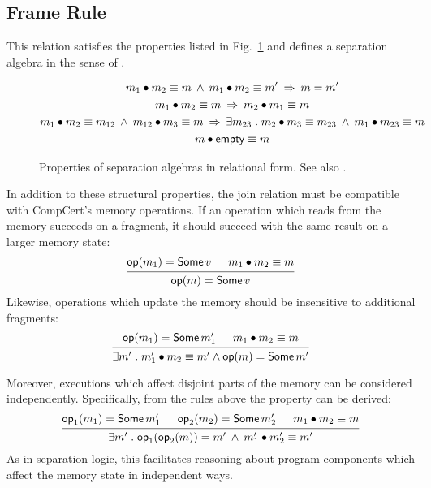 \subsection{Frame Rule}

This relation satisfies the properties listed in Fig.~\ref{fig:sepalg}
and defines a separation algebra in the sense of \citet{freshlook}.

\begin{figure}
  \begin{gather*}
    m_1 \bullet m_2 \equiv m \:\wedge\:
    m_1 \bullet m_2 \equiv m' \:\Rightarrow\:
    m = m'
    \\
    m_1 \bullet m_2 \equiv m \:\Rightarrow\:
    m_2 \bullet m_1 \equiv m
    \\
    m_1 \bullet m_2 \equiv m_{12} \:\wedge\:
    m_{12} \bullet m_3 \equiv m \:\Rightarrow\:
    \exists m_{23} \mathrel.
    m_2 \bullet m_3 \equiv m_{23} \:\wedge\:
    m_1 \bullet m_{23} \equiv m
    \\
    m \bullet  \mathsf{empty}  \equiv m
  \end{gather*}
  \caption{Properties of separation algebras
  in relational form. See also \citet{freshlook}.}
  \label{fig:sepalg}
\end{figure}

In addition to these structural properties,
the join relation must be compatible
with CompCert's memory operations.
If an operation which reads from the memory succeeds on a fragment,
it should succeed with the same result on a larger memory state:
\[
  \begin{prooftree}
    \hypo{\kw{op}(m_1) = \kw{Some}\,v}
    \hypo{m_1 \bullet m_2 \equiv m}
    \infer2{\kw{op}(m) = \kw{Some}\,v}
  \end{prooftree}
\]
Likewise,
operations which update the memory
should be insensitive to additional fragments:
\[
  \begin{prooftree}
    \hypo{\kw{op}(m_1) = \kw{Some}\,m_1'}
    \hypo{m_1 \bullet m_2 \equiv m}
    \infer2{\exists m' \mathrel.
      m_1' \bullet m_2 \equiv m' \wedge
    \kw{op}(m) = \kw{Some}\,m'}
  \end{prooftree}
\]

Moreover,
executions which affect disjoint parts of the memory
can be considered independently.
Specifically, from the rules above
the property can be derived:
\[
  \begin{prooftree}
    \hypo{\kw{op}_1(m_1) = \kw{Some}\,m_1'}
    \hypo{\kw{op}_2(m_2) = \kw{Some}\,m_2'}
    \hypo{m_1 \bullet m_2 \equiv m}
    \infer3{\exists m' \mathrel.
      \kw{op}_1(\kw{op}_2(m)) =
      m' \:\wedge\:
    m_1' \bullet m_2' \equiv m'}
  \end{prooftree}
\]
As in separation logic,
this facilitates reasoning
about program components
which affect the memory state in independent ways.


